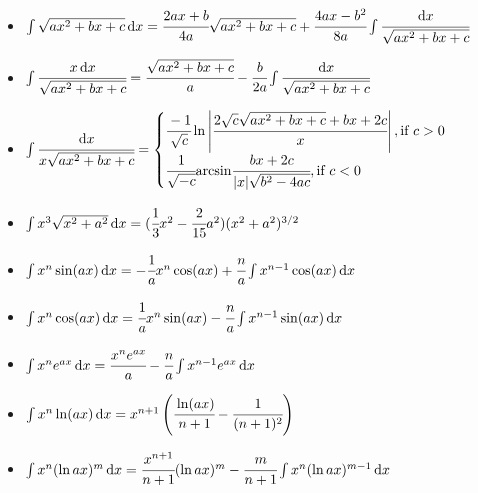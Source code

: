 \begin{itemize}
\item $ \int \sqrt{a x^2  + bx + c} \, { { \text{d} } x} = \cfrac{2ax + b}{4a} \sqrt{a x^2  + bx + c} + \cfrac{4ax - b^2}{8a} \int \cfrac{{ { \text{d} } x}}{\sqrt{a x^2  + bx + c}} $
\item $ \int \cfrac{x \, { { \text{d} } x}}{ \sqrt{a x^2  + bx + c}} = \cfrac{\sqrt{a x^2  + bx + c} }{ a} - \cfrac{b }{ 2a} \int \cfrac{{ { \text{d} } x} }{ \sqrt{a x^2  + bx + c}} $
\item $ \int \cfrac{{ { \text{d} } x} }{ x \sqrt{a x^2  + bx + c}} =
  \begin{cases}
  \displaystyle \cfrac{-1}{ \sqrt{c}} \ln \left\vert\cfrac{2\sqrt{c} \sqrt{ax^2 + bx + c} + bx + 2c }{ x}\right\vert, \text{if $c > 0$} \\
  \displaystyle \cfrac{1 }{ \sqrt{- c}} { \mathop{\text{arcsin}} } \cfrac{bx + 2c }{ \vert x \vert\sqrt{b^2 - 4ac}}, \text{if $c < 0$}
  \end{cases}
$
\item $ \int x^3  \sqrt{x^2 + a^2} \, { { \text{d} } x} = (\cfrac{1}{3} x^2 - \cfrac{2}{15} a^2)(x^2 + a^2)^{3/2} $
\item $ \int x^n \sin (ax) \, { { \text{d} } x} = - \cfrac{1}{a} x^n \cos (ax) + \cfrac{n}{a} \int x^{n-1} \cos (ax) \, { { \text{d} } x} $
\item $ \int x^n \cos (ax) \, { { \text{d} } x} = \cfrac{1}{a} x^n \sin (ax) - \cfrac{n}{a} \int x^{n-1} \sin (ax) \, { { \text{d} } x} $
\item $ \int x^n e^{ax} \, { { \text{d} } x} = \cfrac{x^n e^{ax}}{a} - \cfrac{n}{a} \int x^{n-1} e^{ax} \, { { \text{d} } x} $
\item $ \int x^n \ln (ax) \, { { \text{d} } x} = x^{n+1}\left(\cfrac{\ln (ax) }{ n+1} - \cfrac{1 }{ (n+1)^2}\right) $
\item $ \int x^n (\ln ax)^m \, { { \text{d} } x} = \cfrac{x^{n+1}}{n+1}(\ln ax)^m - \cfrac{m}{n+1}\int x^n (\ln ax)^{m-1} \, { { \text{d} } x} $

\end{itemize}


